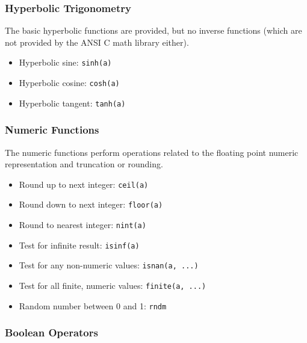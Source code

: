 \subsubsection{Hyperbolic Trigonometry}

The basic hyperbolic functions are provided, but no inverse functions (which are not provided by the ANSI C math library either).

\begin{itemize}
\item Hyperbolic sine: \verb|sinh(a)|

\item Hyperbolic cosine: \verb|cosh(a)|

\item Hyperbolic tangent: \verb|tanh(a)|

\end{itemize}

\subsubsection{Numeric Functions}

The numeric functions perform operations related to the floating point numeric representation and truncation or rounding.

\begin{itemize}
\item Round up to next integer: \verb|ceil(a)|

\item Round down to next integer: \verb|floor(a)|

\item Round to nearest integer: \verb|nint(a)|

\item Test for infinite result: \verb|isinf(a)|

\item Test for any non-numeric values: \verb|isnan(a, ...)|

\item Test for all finite, numeric values: \verb|finite(a, ...)|

\item Random number between 0 and 1: \verb|rndm|

\end{itemize}

\subsubsection{Boolean Operators}

